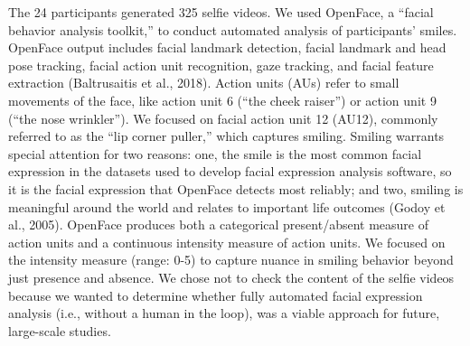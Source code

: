 \documentclass[authordate, empirical]{jote-new-article}
\begin{document}
The 24 participants generated 325 selfie videos. We used OpenFace, a “facial behavior analysis toolkit,” to conduct automated analysis of participants' smiles. OpenFace output includes facial landmark detection, facial landmark and head pose tracking, facial action unit recognition, gaze tracking, and facial feature extraction (Baltrusaitis et al., 2018). Action units (AUs) refer to small movements of the face, like action unit 6 (“the cheek raiser”) or action unit 9 (“the nose wrinkler”). We focused on facial action unit 12 (AU12), commonly referred to as the “lip corner puller,” which captures smiling. Smiling warrants special attention for two reasons: one, the smile is the most common facial expression in the datasets used to develop facial expression analysis software, so it is the facial expression that OpenFace detects most reliably; and two, smiling is meaningful around the world and relates to important life outcomes (Godoy et al., 2005). OpenFace produces both a categorical present/absent measure of action units and a continuous intensity measure of action units. We focused on the intensity measure (range: 0-5) to capture nuance in smiling behavior beyond just presence and absence. We chose not to check the content of the selfie videos because we wanted to determine whether fully automated facial expression analysis (i.e., without a human in the loop), was a viable approach for future, large-scale studies.
\end{document}
